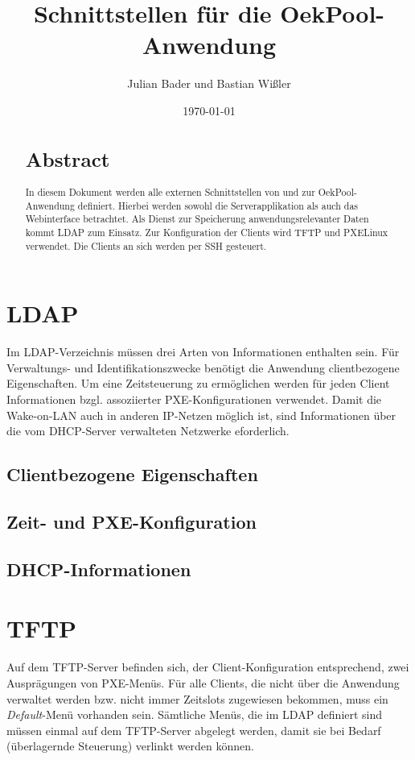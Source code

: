 \documentclass[	
				a4paper, 
				twoside,
				11pt,
				DIV11,
				BCOR12mm,
				bibtotoc, 
				halfparskip, 
				headsepline, 
				pointlessnumbers]{scrartcl}
\title{Schnittstellen für die OekPool-Anwendung}
\author{Julian Bader und Bastian Wißler}
\date{\today}
\begin{document}
\maketitle
\indent
\begin{abstract}
\section*{Abstract}
In diesem Dokument werden alle externen Schnittstellen von und zur OekPool-Anwendung definiert.
Hierbei werden sowohl die Serverapplikation als auch das Webinterface betrachtet.
Als Dienst zur Speicherung anwendungsrelevanter Daten kommt LDAP zum Einsatz.
Zur Konfiguration der Clients wird TFTP und PXELinux verwendet.
Die Clients an sich werden per SSH gesteuert.
\end{abstract}
\newpage

\section{LDAP}
Im LDAP-Verzeichnis müssen drei Arten von Informationen enthalten sein.
Für Verwaltungs- und Identifikationszwecke benötigt die Anwendung clientbezogene Eigenschaften.
Um eine Zeitsteuerung zu ermöglichen werden für jeden Client Informationen bzgl. assoziierter PXE-Konfigurationen verwendet.
Damit die Wake-on-LAN auch in anderen IP-Netzen möglich ist, sind Informationen über die vom DHCP-Server verwalteten Netzwerke eforderlich.

\subsection{Clientbezogene Eigenschaften}
\subsection{Zeit- und PXE-Konfiguration}
\subsection{DHCP-Informationen}

\section{TFTP}
Auf dem TFTP-Server befinden sich, der Client-Konfiguration entsprechend, zwei Ausprägungen von PXE-Menüs.
Für alle Clients, die nicht über die Anwendung verwaltet werden bzw. nicht immer Zeitslots zugewiesen bekommen, muss ein \textit{Default}-Menü vorhanden sein.
Sämtliche Menüs, die im LDAP definiert sind müssen einmal auf dem TFTP-Server abgelegt werden, damit sie bei Bedarf (überlagernde Steuerung) verlinkt werden können.
\end{document}
